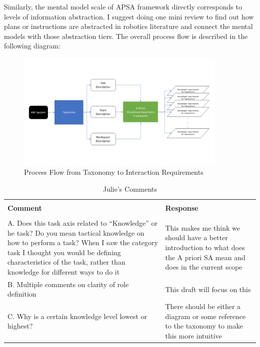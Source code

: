 \documentclass[letterpaper, 10 pt, conference]{ieeeconf} %
\begin{document}
Similarly, the mental model scale of APSA framework directly corresponds to levels of information
abstraction. I suggest doing one mini review to find out how plans or instructions are abstracted in
robotics literature and connect the mental models with those abstraction tiers. The overall process
flow is described in the following diagram:

\begin{figure}[t!]
  \includegraphics[width=0.9\textwidth]{apsa.png}
  \caption{Process Flow from Taxonomy to Interaction Requirements}
\end{figure}

\begin{table}[b!]
  \caption{Julie's Comments}
  \begin{tabular}{p{8cm} | p{8cm}}
    \hline \\
    \textbf{Comment} & \textbf{Response} \\
    \hline \\
    A. Does this task axis related to ``Knowledge'' or he task? Do you mean tactical knowledge on how to
    perform a task? When I saw the category task I thought you would be defining characteristics of
    the task, rather than knowledge for different ways to do it & This makes me think we should
                                                                  have a better introduction to what does the A priori SA mean and does in the current scope \\
    B. Multiple comments on clarity of role definition & This draft will focus on this \\
    C. Why is a certain knowledge level lowest or highest? & There should be either a diagram or some
                                                             reference to the taxonomy to make this more intuitive \\
    \hline
  \end{tabular}
\end{table}
\end{document}

